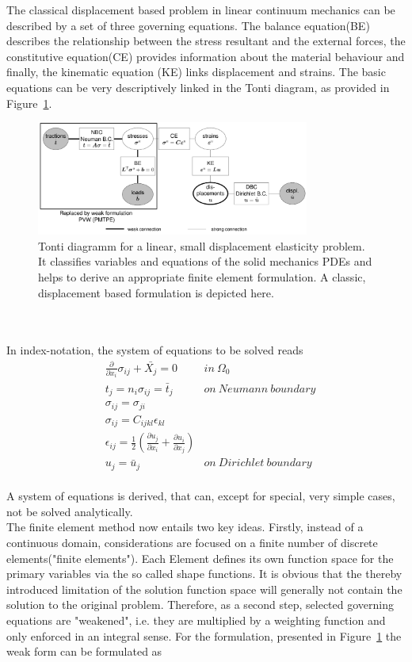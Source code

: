 The classical displacement based problem in linear continuum mechanics can be described by a set of three governing equations. The balance equation(BE) describes the relationship between the stress resultant and the external forces, the constitutive equation(CE) provides information about the material behaviour and finally, the kinematic equation (KE) links displacement and strains.
The basic equations can be very descriptively linked in the Tonti diagram\cite{Tonti2013}, as provided in Figure~\ref{fig:tonti}.\\
\begin{figure}[h]
  \centering
  \includegraphics[width=0.8\textwidth]{./fig/pdf/tonti.pdf}
  \caption[Tonti diagram linear]{Tonti diagramm for a linear, small displacement elasticity problem. It classifies variables and equations of the solid mechanics PDEs and helps to derive an appropriate finite element formulation. A classic, displacement based formulation is depicted here.}\label{fig:tonti}
\end{figure} \\
\\
In index-notation, the system of equations to be solved reads
\begin{align}
    & \frac{\partial}{\partial x_i} \sigma_{ij} + \bar{X_j}=0 & in~\Omega_0           \\
    & t_j=n_i \sigma_{ij} = \bar{t}_j                         & on~Neumann~ boundary  \\
  &\sigma_{ij}=\sigma_{ji}\\
  &\sigma_{ij}=C_{ijkl} \epsilon_{kl}\\
  &\epsilon_{ij}=\frac{1}{2} (\frac{\partial u_j}{\partial x_i}+\frac{\partial u_i}{\partial x_j}) \\
    & u_j = \bar{u}_j                                         & on~Dirichlet~boundary 
\end{align}
\\
A system of equations is derived, that can, except for special, very simple cases, not be solved analytically.\\
The finite element method now entails two key ideas. Firstly, instead of a continuous domain, considerations are focused on a finite number of discrete elements("finite elements"). Each Element defines its own function space for the primary variables via the so called shape functions. It is obvious that the thereby introduced limitation of the solution function space will generally not contain the solution to the original problem.  Therefore, as a second step, selected governing equations are "weakened", i.e. they are multiplied by a weighting function and only enforced in an integral sense. For the formulation, presented in Figure~\ref{fig:tonti} the weak form can be formulated as

